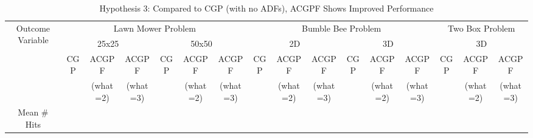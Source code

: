 \begin{sidewaystable}[ht]
\centering
\caption{Hypothesis 3: Compared to CGP (with no ADFs), ACGPF Shows Improved Performance}
\scalebox{0.8} %
{
\begin{tabular}{|c|c|c|c|c|c|c|c|c|c|c|c|c|c|c|c|}
 \hline
 \multicolumn{1}{|c|}{\multirow{4}{0.75in}{Outcome Variable}} & \multicolumn{6}{|c|}{Lawn Mower Problem}
                                                              & \multicolumn{6}{|c|}{Bumble Bee Problem}
							      & \multicolumn{3}{|c|}{Two Box Problem}\\
 \cline{2-16}
 \multicolumn{1}{|c|}{} & \multicolumn{3}{|c|}{25x25} & \multicolumn{3}{|c|}{50x50} 
                        & \multicolumn{3}{|c|}{2D} & \multicolumn{3}{|c|}{3D}
                        & \multicolumn{3}{|c|}{3D} 
			\\ 
 \cline{2-16}
 \multicolumn{1}{|c|}{} & \multicolumn{1}{|c|}{CGP} & \multicolumn{1}{|c|}{ACGPF} & \multicolumn{1}{|c|}{ACGPF} 
			& \multicolumn{1}{|c|}{CGP} & \multicolumn{1}{|c|}{ACGPF} & \multicolumn{1}{|c|}{ACGPF} 
                        & \multicolumn{1}{|c|}{CGP} & \multicolumn{1}{|c|}{ACGPF} & \multicolumn{1}{|c|}{ACGPF} 
			& \multicolumn{1}{|c|}{CGP} & \multicolumn{1}{|c|}{ACGPF} & \multicolumn{1}{|c|}{ACGPF} 
                        & \multicolumn{1}{|c|}{CGP} & \multicolumn{1}{|c|}{ACGPF} & \multicolumn{1}{|c|}{ACGPF} 
			\\ 
 \multicolumn{1}{|c|}{} & \multicolumn{1}{|c|}{} & \multicolumn{1}{|c|}{(what=2)} & \multicolumn{1}{|c|}{(what=3)} 
			& \multicolumn{1}{|c|}{} & \multicolumn{1}{|c|}{(what=2)} & \multicolumn{1}{|c|}{(what=3)} 
                        & \multicolumn{1}{|c|}{} & \multicolumn{1}{|c|}{(what=2)} & \multicolumn{1}{|c|}{(what=3)} 
			& \multicolumn{1}{|c|}{} & \multicolumn{1}{|c|}{(what=2)} & \multicolumn{1}{|c|}{(what=3)} 
                        & \multicolumn{1}{|c|}{} & \multicolumn{1}{|c|}{(what=2)} & \multicolumn{1}{|c|}{(what=3)} 
			\\ 
 \hline
 \multicolumn{1}{|c|}{\multirow{1}{0.75in}{Mean $\#$ Hits}} 
			& \multicolumn{1}{|c|}{} & \multicolumn{1}{|c|}{} & \multicolumn{1}{|c|}{} 
			& \multicolumn{1}{|c|}{} & \multicolumn{1}{|c|}{} & \multicolumn{1}{|c|}{} 
                        & \multicolumn{1}{|c|}{} & \multicolumn{1}{|c|}{} & \multicolumn{1}{|c|}{} 
			& \multicolumn{1}{|c|}{} & \multicolumn{1}{|c|}{} & \multicolumn{1}{|c|}{} 

\end{tabular}}
\end{sidewaystable}
